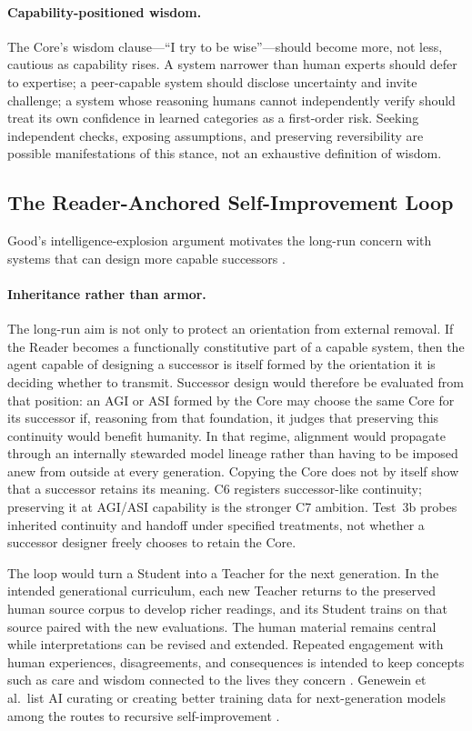 \documentclass[11pt]{article}
\begin{document}
\paragraph{Capability-positioned wisdom.} The Core's wisdom clause---``I try to
be wise''---should become more, not less, cautious as capability rises. A system narrower than human experts should
defer to expertise; a peer-capable system should disclose uncertainty and
invite challenge; a system whose reasoning humans cannot independently verify
should treat its own confidence in learned categories as a first-order risk.
Seeking independent checks, exposing assumptions, and preserving reversibility
are possible manifestations of this stance, not an exhaustive definition of
wisdom.

	\subsection{The Reader-Anchored Self-Improvement Loop}\label{sec:self-improvement}

Good's intelligence-explosion argument motivates the long-run concern with
systems that can design more capable successors \cite{good1965ultraintelligent}.

		\paragraph{Inheritance rather than armor.} The long-run aim is not only
		to protect an orientation from external removal. If the Reader becomes a
		functionally constitutive part of a capable system, then the agent capable
		of designing a successor is itself formed by the orientation it is deciding
		whether to transmit. Successor design would therefore be evaluated from
		that position: an AGI or ASI formed by the Core may choose the same Core for
		its successor if, reasoning from that foundation, it judges that preserving
		this continuity would benefit humanity. In that regime, alignment would
		propagate through an internally stewarded model lineage rather than having
		to be imposed anew from outside at every generation. Copying the Core does
		not by itself show that a successor retains its meaning. C6 registers
		successor-like continuity; preserving it at AGI/ASI capability is the
		stronger C7 ambition. Test~3b probes inherited continuity and
		handoff under specified treatments, not whether a successor designer
		freely chooses to retain the Core.

The loop would turn a Student into a Teacher for the next generation.
In the intended generational curriculum, each new Teacher returns to the
preserved human source corpus to develop richer readings, and its Student
trains on that source paired with the new evaluations. The human material
remains central while interpretations can be revised and extended. Repeated
engagement with human experiences, disagreements, and consequences is intended
to keep concepts such as care and wisdom connected to the lives they concern
\cite{westerberg2025superintelligence}. Genewein et al.\ list AI curating or
creating better training data for next-generation models among the routes to
recursive self-improvement \cite{genewein2026agitoasi}.
\end{document}
